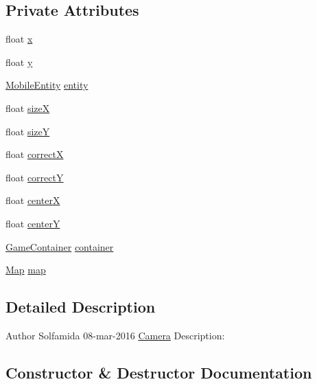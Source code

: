 \subsection*{Private Attributes}
\begin{DoxyCompactItemize}
\item 
float \mbox{\hyperlink{classentities_1_1_camera_a66b52dbb998f7f0a8f0a191d9bf7d35e}{x}}
\item 
float \mbox{\hyperlink{classentities_1_1_camera_ab37210b8774bf7d2210ab91bd1656e68}{y}}
\item 
\mbox{\hyperlink{classentities_1_1_mobile_entity}{Mobile\+Entity}} \mbox{\hyperlink{classentities_1_1_camera_ae57035ea7f7d7d60fc7da6cd51b93316}{entity}}
\item 
float \mbox{\hyperlink{classentities_1_1_camera_aa5e6560668484615713b725a6e1c33b8}{sizeX}}
\item 
float \mbox{\hyperlink{classentities_1_1_camera_a57263eec54d4e2aaee3c60a9591182cf}{sizeY}}
\item 
float \mbox{\hyperlink{classentities_1_1_camera_aff3fca00a4578d5a45ddb9c402d1bf0e}{correctX}}
\item 
float \mbox{\hyperlink{classentities_1_1_camera_a4e9aeca687823695b7f8bd5842d063fc}{correctY}}
\item 
float \mbox{\hyperlink{classentities_1_1_camera_a908104b580c678d793dbbcba35276ff1}{centerX}}
\item 
float \mbox{\hyperlink{classentities_1_1_camera_a67cda85f879ad07eb4884f58ec41e957}{centerY}}
\item 
\mbox{\hyperlink{classorg_1_1newdawn_1_1slick_1_1_game_container}{Game\+Container}} \mbox{\hyperlink{classentities_1_1_camera_ab4ac985dbca326ba055c90fd80b1e1ad}{container}}
\item 
\mbox{\hyperlink{classentities_1_1_map}{Map}} \mbox{\hyperlink{classentities_1_1_camera_a33fca5e9de17b38aa1ddea3a75e89784}{map}}
\end{DoxyCompactItemize}


\subsection{Detailed Description}
\begin{DoxyAuthor}{Author}
Solfamida  08-\/mar-\/2016  \mbox{\hyperlink{classentities_1_1_camera}{Camera}} Description\+: 
\end{DoxyAuthor}


\subsection{Constructor \& Destructor Documentation}
\mbox{\label{classentities_1_1_camera_a38cfcedc6aa02ecc7bcfb6ad050692f3}} 
